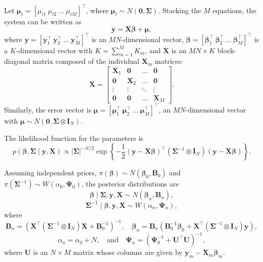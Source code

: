 Let $\bm{\mu}_i = \left[\mu_{i1} \ \mu_{i2} \ \dots \ \mu_{iM}\right]^{\top}$, where $\bm{\mu}_i \sim {N}(\bm{0}, \bm{\Sigma})$. Stacking the $M$ equations, the system can be written as
\[
\bm{y} = \bm{X} \bm{\beta} + \bm{\mu},
\]
where $\bm{y} = \left[\bm{y}_1^{\top} \ \bm{y}_2^{\top} \ \dots \ \bm{y}_M^{\top}\right]^{\top}$ is an $MN$-dimensional vector, $\bm{\beta} = \left[\bm{\beta}_1^{\top} \ \bm{\beta}_2^{\top} \ \dots \ \bm{\beta}_M^{\top}\right]^{\top}$ is a $K$-dimensional vector with $K = \sum_{m=1}^M K_m$, and $\bm{X}$ is an $MN \times K$ block-diagonal matrix composed of the individual $\bm{X}_m$ matrices:
\[
\bm{X} =
\begin{bmatrix}
	\bm{X}_1 & \bm{0} & \dots & \bm{0} \\
	\bm{0} & \bm{X}_2 & \dots & \bm{0} \\
	\vdots & \vdots & \ddots & \vdots \\
	\bm{0} & \bm{0} & \dots & \bm{X}_M
\end{bmatrix}.
\]
Similarly, the error vector is $\bm{\mu} = \left[\bm{\mu}_1^{\top} \ \bm{\mu}_2^{\top} \ \dots \ \bm{\mu}_M^{\top}\right]^{\top}$, an $MN$-dimensional vector with $\bm{\mu} \sim {N}(\bm{0}, \bm{\Sigma} \otimes \bm{I}_N)$.

The likelihood function for the parameters is
\[
p(\bm{\beta}, \bm{\Sigma} \mid \bm{y}, \bm{X}) \propto |\bm{\Sigma}|^{-N/2}
\exp\left\{ -\frac{1}{2} (\bm{y} - \bm{X} \bm{\beta})^{\top}
(\bm{\Sigma}^{-1} \otimes \bm{I}_N) (\bm{y} - \bm{X} \bm{\beta}) \right\}.
\]

Assuming independent priors, $\pi(\bm{\beta}) \sim {N}(\bm{\beta}_0, \bm{B}_0)$ and
$\pi(\bm{\Sigma}^{-1}) \sim {W}(\alpha_0, \bm{\Psi}_0)$, the posterior distributions are
\begin{equation*}
	\bm{\beta} \mid \bm{\Sigma}, \bm{y}, \bm{X} \sim {N}(\bm{\beta}_n, \bm{B}_n),
\end{equation*}
\begin{equation*}
	\bm{\Sigma}^{-1} \mid \bm{\beta}, \bm{y}, \bm{X} \sim {W}(\alpha_n, \bm{\Psi}_n),
\end{equation*}
where
\[
\bm{B}_n = \left(\bm{X}^{\top} (\bm{\Sigma}^{-1} \otimes \bm{I}_N) \bm{X} + \bm{B}_0^{-1}\right)^{-1}, \quad
\bm{\beta}_n = \bm{B}_n \left(\bm{B}_0^{-1}\bm{\beta}_0 + \bm{X}^{\top}(\bm{\Sigma}^{-1} \otimes \bm{I}_N)\bm{y}\right),
\]
\[
\alpha_n = \alpha_0 + N, \quad \text{and} \quad
\bm{\Psi}_n = \left(\bm{\Psi}_0^{-1} + \bm{U}^{\top}\bm{U}\right)^{-1},
\]
where $\bm{U}$ is an $N \times M$ matrix whose columns are given by
$\bm{y}_m - \bm{X}_m \bm{\beta}_m$.

